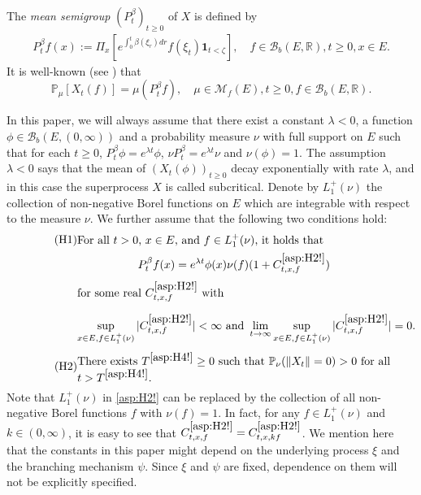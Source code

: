 \documentclass[12pt,a4paper]{amsart}
\numberwithin{equation}{section}
\theoremstyle{plain}
\theoremstyle{definition}
\theoremstyle{remark}
\begin{document}
The \emph{mean semigroup} $(P_t^\beta)_{t\geq 0}$ of $X$ is defined by
\begin{align}
	P_t^\beta f(x)
	:= \Pi_x\left[e^{\int_0^t \beta(\xi_r)dr }f(\xi_t)  \mathbf 1_{t < \zeta}\right],
	\quad f\in \mathcal B_b(E,\mathbb R), t\geq 0, x\in E.
\end{align}
	It is well-known (see \cite[Proposition 2.27]{Li2011MeasureValued}) that
\begin{equation} \label{Fact:M!}
	\mathbb P_\mu[X_t(f)] = \mu (P_t^\beta f),
	\quad \mu \in \mathcal M_f(E), t\geq 0, f \in \mathcal B_b(E,\mathbb R).
\end{equation}	

In this paper, we will always assume that there exist a constant $\lambda<0$,
a function $\phi \in \mathcal B_b(E,(0,\infty))$ and a probability measure $\nu$ with full support on $E$ such that for each $t\geq 0$, $P_t^\beta \phi = e^{\lambda t}\phi$, $\nu P_t^\beta = e^{\lambda t} \nu$ and $\nu(\phi) = 1$.
	The assumption $\lambda<0$ says that the mean of $(X_t(\phi))_{t\geq 0}$ decay exponentially with rate $\lambda$, and in this case the superprocess $X$ is called subcritical.
	Denote by $L_1^+(\nu)$ the collection of
	non-negative Borel functions on $E$ which are integrable with respect to the measure $\nu$.
	We further assume that the following two conditions  hold:
\begin{align}
\label{asp:H2!} \tag{H1}
&\begin{minipage}{0.8\textwidth}
	For all $t>0$, $x\in E$, and $f\in L_1^+(\nu)$, it holds that
\end{minipage}
\\
&\begin{minipage}{0.8\textwidth}
	\[ P_t^\beta f(x) = e^{\lambda t} \phi(x) \nu(f) (1+ C^{\eqref{asp:H2!}}_{t,x,f})\]
	for some real $C^{\eqref{asp:H2!}}_{t,x,f}$ with
	\[\sup_{x\in E, f\in L_1^+(\nu)} |C^{\eqref{asp:H2!}}_{t,x,f}| < \infty
	\mbox{ and }
	\lim_{t\to \infty} \sup_{x\in E, f\in L_1^+(\nu)} |C^{\eqref{asp:H2!}}_{t,x,f}| = 0.\]
\end{minipage}
\end{align}
\begin{equation}
\label{asp:H4!} \tag{H2}
\begin{minipage}{0.8\textwidth}
	There exists  $T^{\eqref{asp:H4!}}\geq 0$ such that $\mathbb P_\nu(\|X_t\| = 0)>0$ for all $t> T^{\eqref{asp:H4!}}$.
\end{minipage}
\end{equation}
	Note that $L_1^+(\nu)$ in \eqref{asp:H2!} can be replaced by the collection of all non-negative Borel functions $f$ with $\nu(f) = 1$.
	In fact, for any $f\in L_1^+(\nu)$ and $k \in (0,\infty)$, it is easy to see that $C^{\eqref{asp:H2!}}_{t,x,f} = C^{\eqref{asp:H2!}}_{t,x,kf}$.
	We  mention here that the constants in this paper might depend on the underlying process $\xi$ and the branching mechanism $\psi$.
	Since $\xi$ and $\psi$ are fixed, dependence on them will not be explicitly specified.
\end{document}
